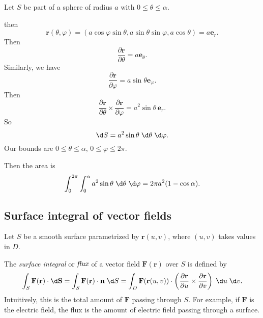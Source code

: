\documentclass[a4paper]{article}
\begin{document}
\begin{eg}
  Let $S$ be part of a sphere of radius $a$ with $0 \leq \theta \leq \alpha$.
  \begin{center}
  \end{center}
  then
  \[
    \mathbf{r}(\theta, \varphi) = (a\cos\varphi\sin \theta, a\sin \theta\sin \varphi, a\cos \theta) = a\mathbf{e}_r.
  \]
  Then
  \[
    \frac{\partial \mathbf{r}}{\partial \theta} = a\mathbf{e}_\theta.
  \]
  Similarly, we have
  \[
    \frac{\partial \mathbf{r}}{\partial \varphi} = a\sin \theta \mathbf{e}_\varphi.
  \]
  Then
  \[
    \frac{\partial \mathbf{r}}{\partial \theta}\times \frac{\partial \mathbf{r}}{\partial \varphi} = a^2\sin \theta\, \mathbf{e}_r.
  \]
  So
  \[
    \d S = a^2\sin \theta\;\d \theta\;\d \varphi.
  \]
  Our bounds are $0 \leq \theta \leq \alpha$, $0 \leq \varphi \leq 2\pi$.

  Then the area is
  \[
    \int_0^{2\pi}\int_0^{\alpha} a^2\sin \theta\;\d \theta \;\d \varphi = 2\pi a^2(1 - \cos\alpha).
  \]
\end{eg}
\subsection{Surface integral of vector fields}
Let $S$ be a smooth surface parametrized by $\mathbf{r}(u, v)$, where $(u, v)$ takes values in $D$.
\begin{defi}
  The \emph{surface integral} or $\emph{flux}$ of a vector field $\mathbf{F}(\mathbf{r})$ over $S$ is defined by
  \[
    \int_S \mathbf{F}(\mathbf{r})\cdot \d \mathbf{S} = \int_S \mathbf{F}(\mathbf{r})\cdot \mathbf{n}\;\d S = \int_D \mathbf{F}(\mathbf{r}(u, v))\cdot \left(\frac{\partial \mathbf{r}}{\partial u}\times \frac{\partial \mathbf{r}}{\partial v}\right)\;\d u\;\d v.
  \]
  Intuitively, this is the total amount of $\mathbf{F}$ passing through $S$. For example, if $\mathbf{F}$ is the electric field, the flux is the amount of electric field passing through a surface.
\end{defi}
\end{document}
